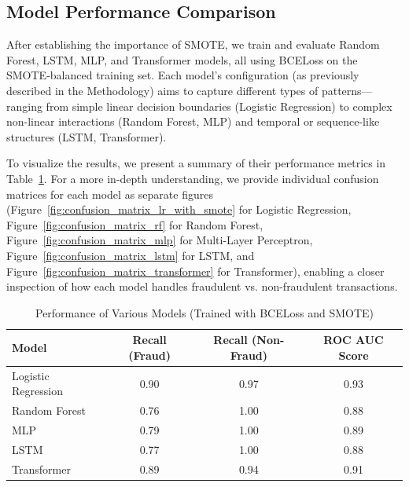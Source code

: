 \documentclass[11pt, oneside]{article}   	%
\begin{document}
\subsection{Model Performance Comparison}

After establishing the importance of SMOTE, we train and evaluate Random Forest, LSTM, MLP, and Transformer models, all using BCELoss on the SMOTE-balanced training set. Each model’s configuration (as previously described in the Methodology) aims to capture different types of patterns—ranging from simple linear decision boundaries (Logistic Regression) to complex non-linear interactions (Random Forest, MLP) and temporal or sequence-like structures (LSTM, Transformer).

To visualize the results, we present a summary of their performance metrics in Table~\ref{tab:model_performance_bce}. For a more in-depth understanding, we provide individual confusion matrices for each model as separate figures (Figure~\ref{fig:confusion_matrix_lr_with_smote} for Logistic Regression, Figure~\ref{fig:confusion_matrix_rf} for Random Forest, Figure~\ref{fig:confusion_matrix_mlp} for Multi-Layer Perceptron, Figure~\ref{fig:confusion_matrix_lstm} for LSTM, and Figure~\ref{fig:confusion_matrix_transformer} for Transformer), enabling a closer inspection of how each model handles fraudulent vs. non-fraudulent transactions.

\begin{table}[H]
\centering
\caption{Performance of Various Models (Trained with BCELoss and SMOTE)}
\label{tab:model_performance_bce}
\begin{tabular}{lccc}
\hline
Model & Recall (Fraud) & Recall (Non-Fraud) & ROC AUC Score \\
\hline
Logistic Regression & 0.90 & 0.97 & 0.93 \\
Random Forest       & 0.76 & 1.00 & 0.88 \\
MLP                 & 0.79 & 1.00 & 0.89 \\
LSTM                & 0.77 & 1.00 & 0.88 \\
Transformer         & 0.89 & 0.94 & 0.91 \\
\hline
\end{tabular}
\end{table}
\end{document}
